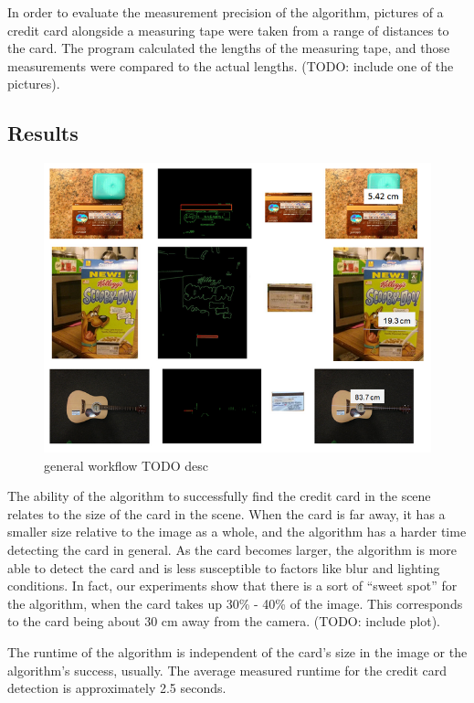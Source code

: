 \documentclass[10pt,twocolumn,letterpaper]{article}
\begin{document}
	In order to evaluate the measurement precision of the algorithm, pictures of a credit card alongside a measuring tape were taken from a range of distances to the card. The program calculated the lengths of the measuring tape, and those measurements were compared to the actual lengths. (TODO: include one of the pictures).
\subsection{Results}

\begin{figure}
\begin{center}
	   \includegraphics[width=0.8\linewidth]{general-workflow}
\end{center}
   \caption{general workflow TODO desc}
\label{fig:general-workflow}
\end{figure}

	The ability of the algorithm to successfully find the credit card in the scene relates to the size of the card in the scene. When the card is far away, it has a smaller size relative to the image as a whole, and the algorithm has a harder time detecting the card in general. As the card becomes larger, the algorithm is more able to detect the card and is less susceptible to factors like blur and lighting conditions. In fact, our experiments show that there is a sort of 
“sweet spot” for the algorithm, when the card takes up 30\% - 40\% of the image. This corresponds to the card being about 30 cm away from the camera. (TODO: include plot).

	The runtime of the algorithm is independent of the card’s size in the image or the algorithm’s success, usually. The average measured runtime for the credit card detection is approximately 2.5 seconds. 
\end{document}
